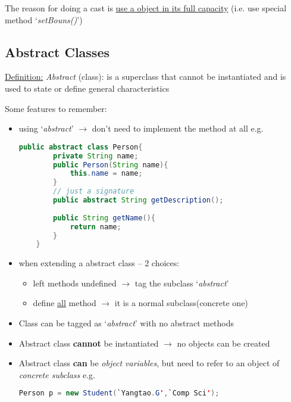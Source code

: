 \documentclass[12pt]{article}
\begin{document}
The reason for doing a cast is \underline{use a object in its full capacity} (i.e. use special method `\emph{setBouns()}')

\subsection{Abstract Classes}
\underline{Definition:} \emph{Abstract} (class): is a superclass that cannot be instantiated 
and is used to state or define general characteristics

Some features to remember:
\begin{itemize}
    \item using `\emph{abstract}' $\rightarrow$ don't need to implement the method at all\newline
    e.g.
    \begin{lstlisting}[language=Java]
    public abstract class Person{
        private String name;
        public Person(String name){
            this.name = name;
        }
        // just a signature
        public abstract String getDescription();
        
        public String getName(){
            return name;
        }
    }
    \end{lstlisting}

    \item when extending a abstract class -- 2 choices:
    \begin{itemize}
        \item left methods undefined $\rightarrow$ tag the subclass `\emph{abstract}'
        \item define \underline{all} method $\rightarrow$ it is a normal subclass(concrete one)
    \end{itemize}

    \item Class can be tagged as `\emph{abstract}' with no abstract methods
    \item Abstract class \textbf{cannot} be instantiated $\rightarrow$ no objects can be created
    \item Abstract class \textbf{can} be \emph{object variables}, but need to refer to an object of \textit{concrete subclass}\newline
    e.g.
    \begin{lstlisting}[language=Java]
    Person p = new Student(`Yangtao.G',`Comp Sci');
    \end{lstlisting}
\end{itemize}
\end{document}
